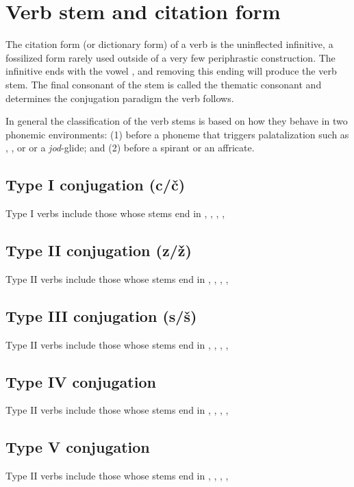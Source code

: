 \section{Verb stem and citation form}

\par The citation form (or dictionary form) of a verb is the uninflected infinitive, a fossilized form rarely used outside of a very few periphrastic construction. The infinitive ends with the vowel , and removing this ending will produce the verb stem. The final consonant  of the stem is called the thematic consonant and determines the conjugation paradigm the verb follows.

In general the classification of the verb stems is based on how they behave in two phonemic environments: (1) before a phoneme that triggers palatalization such as , ,  or  or a \emph{jod}-glide; and (2) before a spirant or an affricate.

\subsection{Type I conjugation (c/\v{c})}
Type I verbs include those whose stems end in , , , ,

\subsection{Type II conjugation (z/\v{z})}
Type II verbs include those whose stems end in , , , ,

\subsection{Type III conjugation (s/\v{s})}
Type II verbs include those whose stems end in , , , ,

\subsection{Type IV conjugation}
Type II verbs include those whose stems end in , , , ,

\subsection{Type V conjugation}
Type II verbs include those whose stems end in , , , ,


